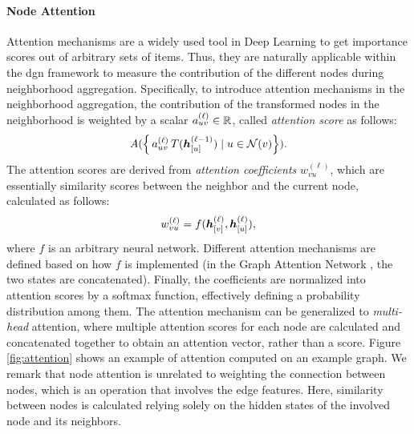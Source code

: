 \paragraph{Node Attention}
Attention mechanisms \citep{bahdanau2015attention} are a widely used tool in Deep Learning to get importance scores out of arbitrary sets of items. Thus, they are naturally applicable within the \gls{dgn} framework to measure the contribution of the different nodes during neighborhood aggregation. Specifically, to introduce attention mechanisms in the neighborhood aggregation, the contribution of the transformed nodes in the neighborhood is weighted by a scalar $a^{(\ell)}_{uv} \in \mathbb{R}$, called \emph{attention score} as follows:
$$A(\Set{\,a^{(\ell)}_{uv}\,T(\StateVector{u}{\ell-1}) \mid u \in \Neigh(v)}).$$
The attention scores are derived from \emph{attention coefficients} $w_{vu}^{(\ell)}$, which are essentially similarity scores between the neighbor and the current node, calculated as follows:
$$w_{vu}^{(\ell)} = f(\StateVector{v}{\ell}, \StateVector{u}{\ell}),$$
where $f$ is an arbitrary neural network. Different attention mechanisms are defined based on how $f$ is implemented (\eg in the Graph Attention Network \cite{velickovic2018gat}, the two states are concatenated). Finally, the coefficients are normalized into attention scores by a softmax function, effectively defining a probability distribution among them. The attention mechanism can be generalized to \emph{multi-head} attention, where multiple attention scores for each node are calculated and concatenated together to obtain an attention vector, rather than a score. Figure \ref{fig:attention} shows an example of attention computed on an example graph. We remark that node attention is unrelated to weighting the connection between nodes, which is an operation that involves the edge features. Here, similarity between nodes is calculated relying solely on the hidden states of the involved node and its neighbors.

\begin{figure*}[h!]
    \centering
    \resizebox{.35\textwidth}{!}{}
    \caption{An example of node attention. Edge thicknesses are not related to the strength of the connection between node $v$ (in dark gray) and its neighbors (in light gray), but it represents the degree of similarity between the node states, quantified in a probabilistic sense by the attention score. Dashed edges connect nodes that are not involved in the attention score computation.}
    \label{fig:attention}
\end{figure*}

